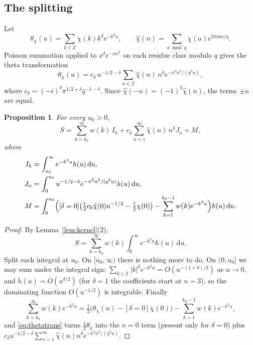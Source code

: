 \documentclass[11pt]{amsart}
\newtheorem{proposition}[theorem]{Proposition}
\theoremstyle{definition}
\theoremstyle{remark}
\newcommand{\dd}{\,\mathrm{d}}
\newcommand{\ZZ}{\mathbb{Z}}
\begin{document}
\subsection{The splitting}
Let
\[
  \theta_\chi(u) = \sum_{k \in \ZZ} \chi(k) k^\delta e^{-k^2u}, \qquad
  \hat\chi(n) = \sum_{a \bmod q} \chi(a) e^{2\pi i a n/q}.
\]
Poisson summation applied to $x^\delta e^{-ux^2}$ on each residue class modulo $q$ gives the theta transformation
\begin{equation}\label{eq:thetatrans}
  \theta_\chi(u) = c_\delta\, u^{-1/2-\delta} \sum_{n \in \ZZ} \hat\chi(n)\, n^\delta e^{-\pi^2 n^2/(q^2u)},
\end{equation}
where $c_\delta = (-i)^\delta \pi^{1/2+\delta} q^{-1-\delta}$.
Since $\hat\chi(-n) = (-1)^\delta\hat\chi(n)$, the terms $\pm n$ are equal.

\begin{proposition}\label{prop:split}
For every $u_0 > 0$,
\[
  S = \sum_{k=k_0}^{\infty} w(k)\, I_k + c_\delta \sum_{n=1}^{\infty} \hat\chi(n)\, n^\delta J_n + M,
\]
where
\begin{align*}
  I_k &= \int_{u_0}^\infty e^{-k^2u} h(u)\dd u, \\
  J_n &= \int_0^{u_0} u^{-1/2-\delta} e^{-\pi^2n^2/(q^2u)} h(u)\dd u, \\
  M &= \int_0^{u_0} \Bigl( [\delta = 0]\bigl(\tfrac12 c_0\hat\chi(0) u^{-1/2} - \tfrac12\chi(0)\bigr)
       - \sum_{k=1}^{k_0-1} w(k) e^{-k^2u} \Bigr) h(u)\dd u .
\end{align*}
\end{proposition}

\begin{proof}
By Lemma~\ref{lem:kernel}(2),
\[
  S = \sum_{k=k_0}^{\infty} w(k)\int_0^\infty e^{-k^2u}h(u)\dd u.
\]
Split each integral at $u_0$. On $[u_0,\infty)$ there is nothing more to do. On $(0, u_0]$ we may sum under the
integral sign: $\sum_{k\in\ZZ} |k|^\delta e^{-k^2u} = O(u^{-(1+\delta)/2})$ as $u \to 0$, and $h(u) = O(u^{\delta/2})$
(for $\delta = 1$ the coefficients start at $n = 3$), so the dominating function $O(u^{-1/2})$ is integrable. Finally
\[
  \sum_{k=k_0}^{\infty} w(k) e^{-k^2u} = \tfrac12\bigl(\theta_\chi(u) - [\delta=0]\chi(0)\bigr) - \sum_{k=1}^{k_0-1} w(k)e^{-k^2u},
\]
and \eqref{eq:thetatrans} turns $\frac12\theta_\chi$ into the $n = 0$ term (present only for $\delta = 0$)
plus $c_\delta u^{-1/2-\delta}\sum_{n=1}^{\infty}\hat\chi(n)n^\delta e^{-\pi^2n^2/(q^2u)}$.
\end{proof}
\end{document}
